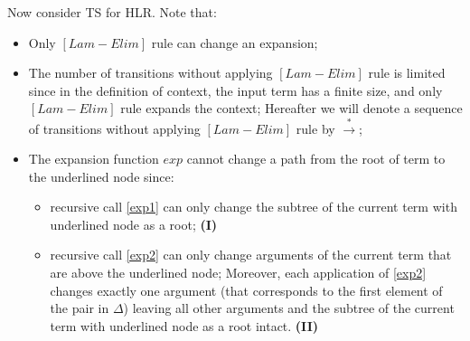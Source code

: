 \documentclass[a4paper, 10pt]{article}
\begin{document}
Now consider TS for HLR. Note that:
\begin{itemize}
\item Only $[Lam-Elim]$ rule can change an expansion;
\item The number of transitions without applying $[Lam-Elim]$ rule is limited since in the definition of context, the input term
  has a
  finite size, and only $[Lam-Elim]$ rule expands the context; Hereafter we will denote a sequence of transitions without
  applying $[Lam-Elim]$ rule by $\overset{*}{\rightarrow}$;
\item The expansion function $exp$ cannot change a path from the root of term to the underlined node since:
  \begin{itemize}
  \item recursive call \eqref{exp1} can only change the subtree of the current term with underlined node as a root;
    \hfill{\textbf{(I)}}
  \item recursive call \eqref{exp2} can only change arguments of the current term that are above the underlined node;
    Moreover, each application of \eqref{exp2} changes exactly one argument (that corresponds to the first element of
    the pair in $\Delta$) leaving all other arguments and the subtree of the current term with underlined node as a root intact.
    \hfill{\textbf{(II)}}
  \end{itemize}
\end{itemize}
\end{document}
